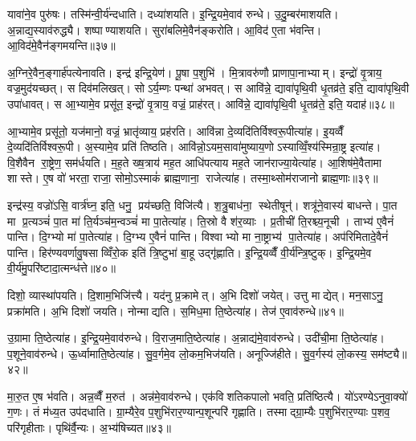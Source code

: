 यावा॑ने॒व पुरु॑षः। तस्मि॑न्वी॒र्य॑न्दधाति। दध्या॑शयति। इ॒न्द्रि॒यमे॒वाव॑ रुन्धे। उ॒दु॒म्बर॑माशयति। अ॒न्नाद्य॒स्याव॑रुद्ध्यै। शष्पाण्याशयति। सुरा॑बलिमे॒वैन॑ङ्करोति। आ॒विद॑ ए॒ता भ॑वन्ति। आ॒विद॑मे॒वैन॑ङ्गमयन्ति॥३७॥

अ॒ग्निरे॒वैन॒ङ्गार्\mbox{}ह॑पत्येनावति। इन्द्र॑ इन्द्रि॒येण॑। पू॒षा प॒शुभि॑। मि॒त्रावरु॑णौ प्राणापा॒नाभ्याम्। इन्द्रो॑ वृ॒त्राय॒ वज्र॒मुद॑यच्छत्। स दिव॑मलिखत्। सोऽर्य॒म्णः पन्था॑ अभवत्। स आवि॑न्ने॒ द्यावा॑पृथि॒वी धृ॒तव्र॑ते॒ इति॒ द्यावा॑पृथि॒वी उपा॑धावत्। स आ॒भ्यामे॒व प्रसू॑त॒ इन्द्रो॑ वृ॒त्राय॒ वज्रं॒ प्राह॑रत्। आवि॑न्ने॒ द्यावा॑पृथि॒वी धृ॒तव्र॑ते॒ इति॒ यदाह॑॥३८॥

आ॒भ्यामे॒व प्रसू॑तो॒ यज॑मानो॒ वज्रं॒ भ्रातृ॑व्याय॒ प्रह॑रति। आवि॑न्ना दे॒व्यदि॑तिर्विश्वरू॒पीत्या॑ह। इ॒यव्वैँ दे॒व्यदि॑तिर्विश्वरू॒पी। अ॒स्यामे॒व प्रति॑ तिष्ठति। आवि॑न्नो॒ऽयम॒सावा॑मुष्याय॒णोऽस्याव्विँ॒श्य॑स्मिन्रा॒ष्ट्र इत्या॑ह। वि॒शैवैन रा॒ष्ट्रेण॒ सम॑र्धयति। म॒ह॒ते ख्ष॒त्राय॑ मह॒त आधि॑पत्याय मह॒ते जान॑राज्या॒येत्या॑ह। आ॒शिष॑मे॒वैतामा शास्ते। ए॒ष वो॑ भरता॒ राजा॒ सोमो॒ऽस्माकं॑ ब्राह्म॒णाना॒ राजेत्या॑ह। तस्मा॒थ्सोम॑राजानो ब्राह्म॒णाः॥३९॥

इन्द्र॑स्य॒ वज्रो॑ऽसि॒ वार्त्र॑घ्न॒ इति॒ धनु॒ प्रय॑च्छति॒ विजि॑त्यै। श॒त्रु॒बाध॑ना॒ स्थेतीषून्॑। शत्रू॑ने॒वास्य॑ बाधन्ते। पा॒त मा प्र॒त्यञ्चं॑ पा॒त मा॑ ति॒र्यञ्च॑म॒न्वञ्चं॑ मा पा॒तेत्या॑ह। ति॒स्रो वै श॑र॒व्याः। प्र॒तीची॑ ति॒रश्च्य॒नूची। ताभ्य॑ ए॒वैनं॑ पान्ति। दि॒ग्भ्यो मा॑ पा॒तेत्या॑ह। दि॒ग्भ्य ए॒वैनं॑ पान्ति। विश्वाभ्यो मा ना॒ष्ट्राभ्य॑ पा॒तेत्या॑ह। अप॑रिमितादे॒वैनं॑ पान्ति। हिर॑ण्यवर्णावु॒षसाव्विँरो॒क इति॑ त्रि॒ष्टुभा॑ बा॒हू उद्गृ॑ह्णाति। इ॒न्द्रि॒यव्वैँ वी॒र्य॑न्त्रि॒ष्टुक्। इ॒न्द्रि॒यमे॒व वी॒र्य॑मु॒परि॑ष्टादा॒त्मन्ध॑त्ते॥४०॥\anuvakamend[व्यावृ॑त्त्यै दा॒त्रम॒सीत्या॑हा॒मृत॒ हिर॑ण्यमेकश॒तो ग॑मय॒न्त्याह॑ ब्राह्म॒णा ना॒ष्ट्राभ्य॑ पा॒तेत्या॑ह च॒त्वारि॑ च]

दिशो॒ व्यास्था॑पयति। दि॒शाम॒भिजि॑त्त्यै। यद॑नु प्र॒क्रामेत्। अ॒भि दिशो॑ जयेत्। उत्तु माद्येत्। मन॒साऽनु॒ प्रक्रा॑मति। अ॒भि दिशो॑ जयति। नोन्माद्यति। स॒मिध॒मा ति॒ष्ठेत्या॑ह। तेज॑ ए॒वाव॑रुन्धे॥४१॥

उ॒ग्रामा ति॒ष्ठेत्या॑ह। इ॒न्द्रि॒यमे॒वाव॑रुन्धे। वि॒राज॒माति॒ष्ठेत्या॑ह। अ॒न्नाद्य॑मे॒वाव॑रुन्धे। उदी॑ची॒मा ति॒ष्ठेत्या॑ह। प॒शूने॒वाव॑रुन्धे। ऊ॒र्ध्वामाति॒ष्ठेत्या॑ह। सु॒व॒र्गमे॒व लो॒कम॒भिज॑यति। अनूज्जि॑हीते। सु॒व॒र्गस्य॑ लो॒कस्य॒ सम॑ष्ट्यै॥४२॥

मा॒रु॒त ए॒ष भ॑वति। अन्न॒व्वैँ म॒रुत॑। अन्न॑मे॒वाव॑रुन्धे। एक॑विशतिकपालो भवति॒ प्रति॑ष्ठित्यै। यो॑ऽरण्येऽनुवा॒क्यो॑ ग॒णः। तं म॑ध्य॒त उप॑दधाति। ग्रा॒म्यैरे॒व प॒शुभि॑रार॒ण्यान्प॒शून्परि॑ गृह्णाति। तस्माद्ग्रा॒म्यैः प॒शुभि॑रार॒ण्याः प॒शव॒ परि॑गृहीताः। पृथि॑र्वै॒न्यः। अ॒भ्य॑षिच्यत॥४३॥

